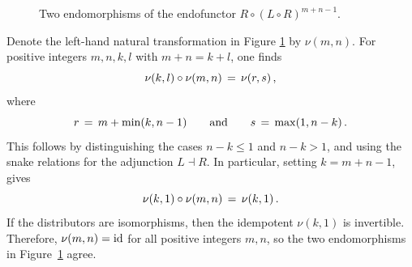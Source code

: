 \documentclass[reqno,12pt]{amsart}
\begin{document}
\begin{example}
\begin{figure}[H]
{}
		\caption{Two endomorphisms of the endofunctor $R\circ (L\circ R)^{m+n-1}$.}
		\label{fig: triple dual problem}
	\end{figure}
	Denote the left-hand natural transformation in Figure \ref{fig: triple dual problem} by $\nu(m,n)$. For positive integers $m,n,k,l$ with $m+n=k+l$, one finds	
\begin{equation*}
{\nu(k,l)} \circ {\nu(m,n)} \,=\, \nu(r,s)\,,
\end{equation*}
 where 
\begin{equation*}
	r\,=\, m+\operatorname{min}(k,n-1) \qquad \text{and} \qquad s \,=\, \operatorname{max}(1,n-k)\,.
\end{equation*}
 This follows by distinguishing the cases $n-k\leq 1$ and $n-k > 1$, and using the snake relations for the adjunction \hyperref[eq:adjunction-L-R]{$L \dashv R$}. In particular, setting $k=m+n-1$, gives 
 \begin{equation*}
 	\nu(k,1)\circ\nu(m,n)\,=\, \nu(k,1) \,.
 \end{equation*}
 If the distributors are isomorphisms, then the idempotent $\nu(k,1)$ is invertible. Therefore, ${\nu(m,n)={\operatorname{id}}}$ for all positive integers $m,n$, so the two endomorphisms in Figure~\ref{fig: triple dual problem} agree.
\end{example}
\end{document}
